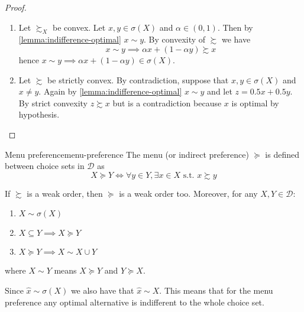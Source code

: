 \documentclass[12pt]{extarticle}
\begin{document}
\begin{proof}
    \skiplineafterproof
    \begin{enumerate}[label=\roman*.]
        \item Let $\succsim_X$ be convex.
              Let $x, y \in \sigma (X)$ and $\alpha \in (0,1)$. Then by \cref{lemma:indifference-optimal} $x \sim y$.
              By convexity of $\succsim$ we have
              \begin{equation}
                  x \sim y \implies \alpha x + (1- \alpha y) \succsim x
              \end{equation}
              hence
              $x \sim y \implies \alpha x + (1- \alpha y) \in \sigma(X)$.

        \item Let $\succsim$ be strictly convex.
              By contradiction, suppose that $x, y \in \sigma(X)$ and $x \neq y$.
              Again by \cref{lemma:indifference-optimal} $x \sim y$ and let $z = 0.5 x + 0.5 y$.
              By strict convexity $z \succsim x$ but is a contradiction because $x$ is optimal by hypothesis.
    \end{enumerate}
\end{proof}

\begin{definition}{Menu preference}{menu-preference}
    The menu (or indirect preference) $\succeq$ is defined between choice sets in $\mathcal D$ as
    \begin{equation}
        X \succeq Y \iff \forall y \in Y, \exists x \in X \text{ s.t. } x \succsim y
    \end{equation}
\end{definition}

\begin{proposition}{}{}
    If $\succsim$ is a weak order, then $\succeq$ is a weak order too.
    Moreover, for any $X, Y \in \mathcal D$:
    \begin{enumerate}[label=\roman*.]
        \item $X \sim \sigma (X)$
        \item $X \subseteq Y \implies X \succeq Y$
        \item $X \succeq Y \implies X \sim X \cup Y$
    \end{enumerate}
    where $X \sim Y$ means $X \succeq Y$ and $Y \succeq X$.
\end{proposition}

Since $\hat x \sim \sigma(X)$ we also have that $\hat x \sim X$.
This means that for the menu preference any optimal alternative is indifferent to the whole choice set.
\end{document}

